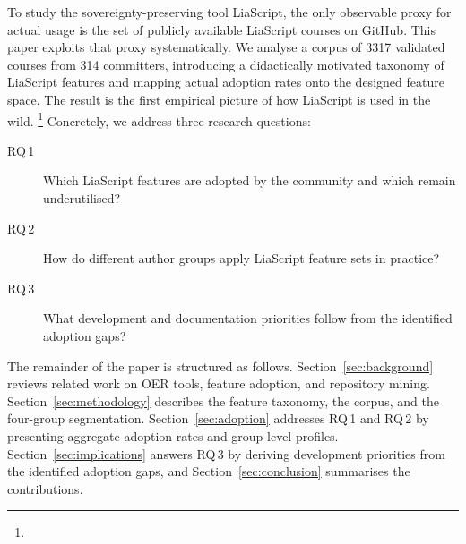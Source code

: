 
To study the sovereignty-preserving tool LiaScript, the only observable proxy for actual usage is the set of publicly available
LiaScript courses on GitHub.
This paper exploits that proxy systematically.
We analyse a corpus of \num{3317} validated courses from \num{314} committers,
introducing a didactically motivated taxonomy of LiaScript features and mapping
actual adoption rates onto the designed feature space.
The result is the first empirical picture of how LiaScript is used in the wild.
\footnote{}
Concretely, we address three research questions:
\begin{description}
  \item[RQ\,1] Which LiaScript features are adopted by the community and
               which remain underutilised?
  \item[RQ\,2] How do different author groups apply LiaScript feature sets in practice?
  \item[RQ\,3] What development and documentation priorities follow from
               the identified adoption gaps?
\end{description}

The remainder of the paper is structured as follows.
Section~\ref{sec:background} reviews related work on OER tools, feature
adoption, and repository mining.
Section~\ref{sec:methodology} describes the feature taxonomy, the corpus,
and the four-group segmentation.
Section~\ref{sec:adoption} addresses RQ\,1 and RQ\,2 by presenting
aggregate adoption rates and group-level profiles.
Section~\ref{sec:implications} answers RQ\,3 by deriving development
priorities from the identified adoption gaps, and
Section~\ref{sec:conclusion} summarises the contributions.
